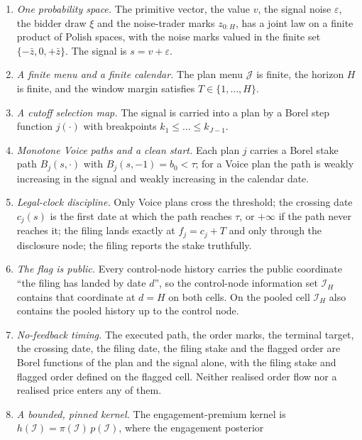 \begin{enumerate}[label=(S\arabic*),leftmargin=3.0em,itemsep=2pt]
\item \label{p:space} \emph{One probability space.} The primitive vector, the value $v$, the signal
  noise $\varepsilon$, the bidder draw $\xi$ and the noise-trader marks $z_{0:H}$, has a joint law
  on a finite product of Polish spaces, with the noise marks valued in the finite set
  $\{-\bar z,0,+\bar z\}$. The signal is $s = v + \varepsilon$.
\item \label{p:menu} \emph{A finite menu and a finite calendar.} The plan menu $\mathcal J$ is
  finite, the horizon $H$ is finite, and the window margin satisfies $T \in \{1,\dots,H\}$.
\item \label{p:cutoff} \emph{A cutoff selection map.} The signal is carried into a plan by a Borel step
  function $j(\cdot)$ with breakpoints $k_1 \le \dots \le k_{J-1}$.
\item \label{p:paths} \emph{Monotone Voice paths and a clean start.} Each plan $j$ carries a Borel stake
  path $B_j(s,\cdot)$ with $B_j(s,-1) = b_0 < \tau$; for a Voice plan the path is weakly increasing
  in the signal and weakly increasing in the calendar date.
\item \label{p:clock} \emph{Legal-clock discipline.} Only Voice plans cross the threshold; the
  crossing date $c_j(s)$ is the first date at which the path reaches $\tau$, or $+\infty$ if the
  path never reaches it; the filing lands exactly at $f_j = c_j + T$ and only through the disclosure
  node; the filing reports the stake truthfully.
\item \label{p:public} \emph{The flag is public.} Every control-node history carries the public
  coordinate ``the filing has landed by date $d$'', so the control-node information set
  $\mathcal I_H$ contains that coordinate at $d = H$ on both cells. On the pooled cell
  $\mathcal I_H$ also contains the pooled history up to the control node.
\item \label{p:nofeedback} \emph{No-feedback timing.} The executed path, the order marks, the
  terminal target, the crossing date, the filing date, the filing stake and the flagged order are
  Borel functions of the plan and the signal alone, with the filing stake and flagged order defined
  on the flagged cell. Neither realised order flow nor a realised price enters any of them.
\item \label{p:kernel} \emph{A bounded, pinned kernel.} The engagement-premium kernel is
  $h(\mathcal I) = \pi(\mathcal I)\,p(\mathcal I)$, where the engagement posterior

\end{enumerate}
